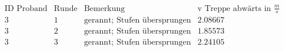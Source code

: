 \[\begin{array}{cccc}
 \text{ID Proband} & \text{Runde} & \text{Bemerkung} & \text{v Treppe abw{\" a}rts in }\frac{m}{s}  \\
 3 & 1 & \text{gerannt; Stufen {\" u}bersprungen} & 2.08667 \\
 3 & 2 & \text{gerannt; Stufen {\" u}bersprungen} & 1.85573 \\
 3 & 3 & \text{gerannt; Stufen {\" u}bersprungen} & 2.24105 \\
\end{array}\]

